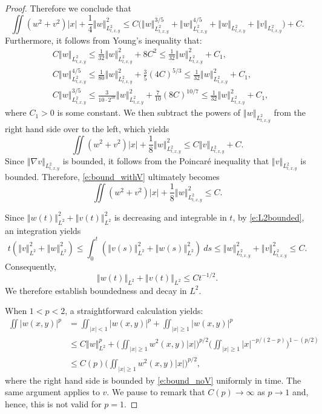 \documentclass[final,11pt]{article}
\renewcommand{\geq}{\geqslant}
\renewcommand{\leq}{\leqslant}
\theoremstyle{definition} %
\newcommand{\lv}{\left\Vert}
\newcommand{\rv}{\right\Vert}
\theoremstyle{plain}
\theoremstyle{definition} %
\theoremstyle{remark}
\begin{document}
\begin{proof}
Therefore we conclude that 
\begin{equation}
    \iint (w^2 + v^2)|x| + \frac{1}{4}\lv w \rv_{L^2_{t,x,y}}^2 \leq C\big(\lv w \rv_{L^2_{t,x,y}}^{3/5} + \lv w \rv_{L^2_{t,x,y}}^{4/5}  + \lv w \rv_{L^2_{t,x,y}}+ \lv v \rv_{L^2_{t,x,y}}\big)  + C.
\end{equation}
Furthermore, it follows from Young's inequality that:
\begin{align*}
&C\lv w \rv_{L^2_{t,x,y}} \leq \frac{1}{32}\lv w \rv_{L^2_{t,x,y}}^2 + 8C^2  \leq \frac{1}{32}\lv w \rv_{L^2_{t,x,y}}^2 + C_1,\\
&C\lv w \rv_{L^2_{t,x,y}}^{4/5}  \leq \frac{1}{80}\lv w \rv_{L^2_{t,x,y}}^2 + \frac{3}{5}(4C)^{5/3} \leq \frac{1}{32}\lv w \rv_{L^2_{t,x,y}}^2 + C_1,\\
&C \lv w \rv_{L^2_{t,x,y}}^{3/5} \leq \frac{3}{10\cdot 2^{10}}\lv w \rv_{L^2_{t,x,y}}^2 + \frac{7}{10}(8C)^{10/7} \leq \frac{1}{32} \lv w \rv_{L^2_{t,x,y}}^2+ C_1,
\end{align*}
where $C_1>0$ is some constant. We then subtract the powers of $\lv w \rv_{L^2_{t,x,y}}$ from the right hand side over to the left, which yields
\begin{equation}\label{e:bound_withV}
 \iint (w^2 + v^2)|x| + \frac{1}{8}\lv w \rv_{L^2_{t,x,y}}^2 \leq C\lv v \rv_{L^2_{t,x,y}}  + C.     
\end{equation}
Since $\lv \nabla v \rv_{L^2_{t,x,y}}$ is bounded, it follows from the Poincar{\'e} inequality that $\lv v \rv_{L^2_{t,x,y}}$ is bounded. Therefore, \eqref{e:bound_withV} ultimately becomes 
\begin{equation}\label{e:bound_noV}
 \iint (w^2 + v^2)|x| + \frac{1}{8}\lv w \rv_{L^2_{t,x,y}}^2 \leq C.  
\end{equation}


Since $\lv w(t) \rv_{L^2}^2 + \lv v(t)\rv_{L^2}^2$ is decreasing and integrable in $t$, by \eqref{e:L2bounded}, an integration yields
\[
t(\lv v \rv_{L^2}^2 + \lv w\rv_{L^2}^2) \leq \int_0^t(\lv v(s) \rv_{L^2}^2 + \lv w(s)\rv_{L^2}^2)~ds \leq \lv w \rv_{L^2_{t,x,y}}^2+\lv v \rv_{L^2_{t,x,y}}^2 \leq C.
\]
Consequently,
\begin{equation}\label{e:L2_decay}
\lv w(t)\rv_{L^2}+\lv v(t)\rv_{L^2} \leq Ct^{-1/2}.
\end{equation}
We therefore establish boundedness and decay in $L^2$. 

When $1 < p < 2$, a straightforward calculation yields: 
\begin{equation}
\begin{split}\label{e:Lp_unif_bound}
    \iint |w(x,y)|^p &= \iint_{|x|<1}|w(x,y)|^p + \iint_{|x|\geq1}|w(x,y)|^p \\
    &\leq C \lv w \rv_{L^2}^p + \Big(\iint_{|x|\geq1}w^2(x,y)|x| \Big)^{p/2}\Big(\iint_{|x|\geq1}|x|^{-p/(2-p)} \Big)^{1-(p/2)} \\
    &\leq C(p)\Big(\iint_{|x|\geq1}w^2(x,y)|x| \Big)^{p/2},
    \end{split}
\end{equation}
where the right hand side is bounded by \eqref{e:bound_noV} uniformly in time. The same argument applies to $v$.  We pause to remark that $C(p) \to \infty$ as $p \to 1$ and, hence, this is not valid for $p = 1$. 


\end{proof}
\end{document}
